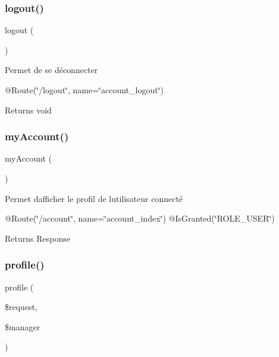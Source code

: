 \subsubsection{\texorpdfstring{logout()}{logout()}}
{\footnotesize\ttfamily logout (\begin{DoxyParamCaption}{ }\end{DoxyParamCaption})}

Permet de se déconnecter

@\+Route(\char`\"{}/logout\char`\"{}, name=\char`\"{}account\+\_\+logout\char`\"{})

\begin{DoxyReturn}{Returns}
void 
\end{DoxyReturn}
\mbox{\label{class_app_1_1_controller_1_1_account_controller_ac7254446c02ace98cda87a70e2a2e429}} 
\subsubsection{\texorpdfstring{myAccount()}{myAccount()}}
{\footnotesize\ttfamily my\+Account (\begin{DoxyParamCaption}{ }\end{DoxyParamCaption})}

Permet d\textquotesingle{}afficher le profil de l\textquotesingle{}utilisateur connecté

@\+Route(\char`\"{}/account\char`\"{}, name=\char`\"{}account\+\_\+index\char`\"{}) @\+Is\+Granted(\char`\"{}\+R\+O\+L\+E\+\_\+\+U\+S\+E\+R\char`\"{})

\begin{DoxyReturn}{Returns}
Response 
\end{DoxyReturn}
\mbox{\label{class_app_1_1_controller_1_1_account_controller_ab03aece09ce75dc5cf354f4dae008dd7}} 
\subsubsection{\texorpdfstring{profile()}{profile()}}
{\footnotesize\ttfamily profile (\begin{DoxyParamCaption}\item[{Request}]{\$request,  }\item[{Object\+Manager}]{\$manager }\end{DoxyParamCaption})}

